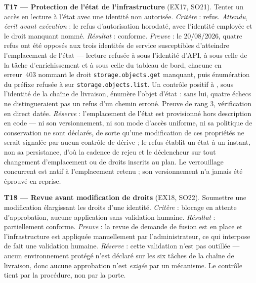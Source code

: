 \textbf{T17 --- Protection de l'état de l'infrastructure} (EX17, SO21). Tenter un accès en lecture
à l'état avec une identité non autorisée. \emph{Critère} : refus. \emph{Attendu, écrit avant
exécution} : le refus d'autorisation horodaté, avec l'identité employée et le droit manquant nommé.
\emph{Résultat} : conforme. \emph{Preuve} : le 20/08/2026, quatre refus ont été opposés aux trois
identités de service susceptibles d'atteindre l'emplacement de l'état --- lecture refusée à
 sous l'identité d'API, à  sous celle de la tâche d'enrichissement et à
 sous celle du tableau de bord, chacune en erreur~403 nommant le droit
\texttt{storage.objects.get} manquant, puis énumération du préfixe refusée à  sur
\texttt{storage.objects.list}. Un contrôle positif à , sous l'identité de la chaîne
de livraison, énumère l'objet d'état : sans lui, quatre échecs ne distingueraient pas un refus d'un
chemin erroné. Preuve de rang 3, vérification en direct datée. \emph{Réserve} : l'emplacement de l'état est
provisionné hors description en code --- ni son versionnement, ni son mode d'accès uniforme, ni sa
politique de conservation ne sont déclarés, de sorte qu'une modification de ces propriétés ne serait
signalée par aucun contrôle de dérive ; le refus établit un état à un instant, non sa persistance,
d'où la cadence de rejeu et le déclencheur sur tout changement d'emplacement ou de droits inscrits
au plan. Le verrouillage concurrent est natif à l'emplacement retenu ; son versionnement n'a jamais
été éprouvé en reprise.

\textbf{T18 --- Revue avant modification de droits} (EX18, SO22). Soumettre une modification
élargissant les droits d'une identité. \emph{Critère} : blocage en attente d'approbation, aucune
application sans validation humaine. \emph{Résultat} : partiellement conforme. \emph{Preuve} : la revue de demande de fusion est en
place et l'infrastructure est appliquée manuellement par l'administrateur, ce qui interpose de fait
une validation humaine. \emph{Réserve} : cette validation n'est pas outillée --- aucun environnement
protégé n'est déclaré sur les six tâches de la chaîne de livraison, donc aucune approbation n'est
\emph{exigée} par un mécanisme. Le contrôle tient par la procédure, non par la porte.

